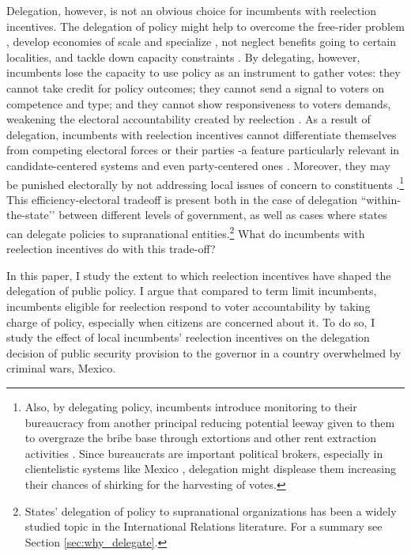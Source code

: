 \documentclass[12pt]{amsart}
\numberwithin{equation}{section}
\theoremstyle{definition}
\theoremstyle{definition}
\theoremstyle{definition}
\begin{document}
Delegation, however, is not an obvious choice for incumbents with reelection incentives. The delegation of policy might help to overcome the free-rider problem \citep{hamman_etal_2011}, develop economies of scale and specialize \citep{Hawkins_etal_2006}, not neglect benefits going to certain localities, and tackle down capacity constraints \citep{oates_1972, besley_coate_2003}. By delegating, however, incumbents lose the capacity to use policy as an instrument to gather votes: they cannot take credit for policy outcomes; they cannot send a signal to voters on competence and type; and they cannot show responsiveness to voters demands, weakening the electoral accountability created by reelection \citep{cox_katz_2002}. As a result of delegation, incumbents with reelection incentives cannot differentiate themselves from competing electoral forces or their parties -a feature particularly relevant in candidate-centered systems and even party-centered ones \citep{motolinia_2020}. Moreover, they may be punished electorally by not addressing local issues of concern to constituents \citep{milner_2004}.\footnote{Also, by delegating policy, incumbents introduce monitoring to their bureaucracy from another principal reducing potential leeway given to them to overgraze the bribe base through extortions and other rent extraction activities \citep{schleifer_vishny_1993}. Since bureaucrats are important political brokers, especially in clientelistic systems like Mexico \citep{larreguy_etal_2017}, delegation might displease them increasing their chances of shirking for the harvesting of votes.} This efficiency-electoral tradeoff is present both in the case of delegation ``within-the-state’’ between different levels of government, as well as cases where states can delegate policies to supranational entities.\footnote{States’ delegation of policy to supranational organizations has been a widely studied topic in the International Relations literature. For a summary see Section \ref{sec:why_delegate}.} What do incumbents with reelection incentives do with this trade-off? 

In this paper, I study the extent to which reelection incentives have shaped the delegation of public policy. I argue that compared to term limit incumbents, incumbents eligible for reelection respond to voter accountability by taking charge of policy, especially when citizens are concerned about it. To do so, I study the effect of local incumbents' reelection incentives on the delegation decision of public security provision to the governor in a country overwhelmed by criminal wars, Mexico. 
\end{document}
